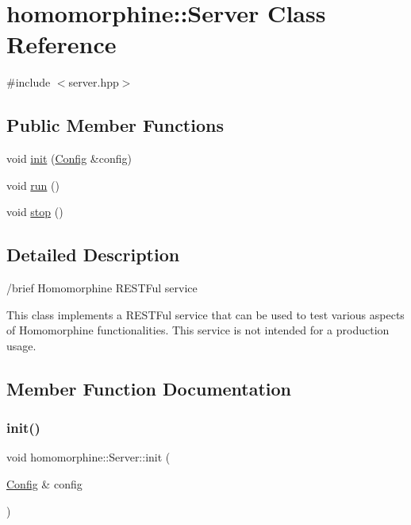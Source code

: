 \hypertarget{classhomomorphine_1_1_server}{}\section{homomorphine\+:\+:Server Class Reference}
\label{classhomomorphine_1_1_server}


{\ttfamily \#include $<$server.\+hpp$>$}

\subsection*{Public Member Functions}
\begin{DoxyCompactItemize}
\item 
void \hyperlink{classhomomorphine_1_1_server_a0fcfa773dc495f0741387cdb11f95ea0}{init} (\hyperlink{classhomomorphine_1_1_config}{Config} \&config)
\item 
void \hyperlink{classhomomorphine_1_1_server_a02ae1a9f2334652a64a498e6a6efc4b1}{run} ()
\item 
void \hyperlink{classhomomorphine_1_1_server_a5655dfcc0a213e6bf1f8d35dbadebf4d}{stop} ()
\end{DoxyCompactItemize}


\subsection{Detailed Description}
/brief Homomorphine R\+E\+S\+T\+Ful service

This class implements a R\+E\+S\+T\+Ful service that can be used to test various aspects of Homomorphine functionalities. This service is not intended for a production usage. 

\subsection{Member Function Documentation}
\mbox{\label{classhomomorphine_1_1_server_a0fcfa773dc495f0741387cdb11f95ea0}} 
\subsubsection{\texorpdfstring{init()}{init()}}
{\footnotesize\ttfamily void homomorphine\+::\+Server\+::init (\begin{DoxyParamCaption}\item[{\hyperlink{classhomomorphine_1_1_config}{Config} \&}]{config }\end{DoxyParamCaption})}

